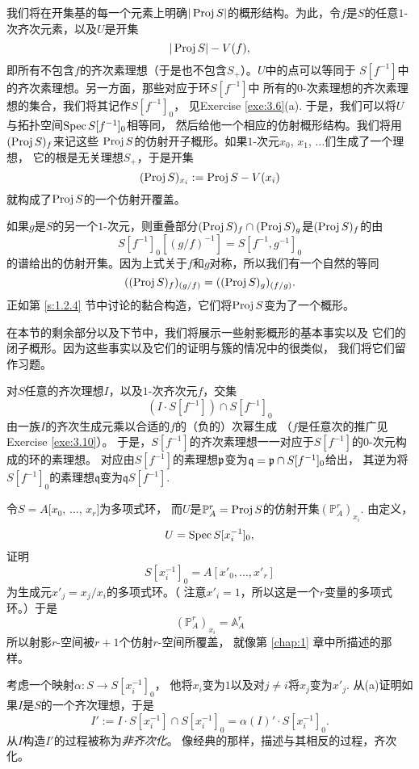 我们将在开集基的每一个元素上明确$|\operatorname{Proj} S|$的概形结构。为此，令$f$是$S$的任意$1$-次齐次元素，以及$U$是开集
\[
	|\operatorname{Proj} S|-V(f),
\]
即所有不包含$f$的齐次素理想（于是也不包含$S_+$）。$U$中的点可以等同于
$S[f^{-1}]$中的齐次素理想。另一方面，那些对应于环$S[f^{-1}]$中
所有的$0$-次素理想的齐次素理想的集合，我们将其记作$S[f^{-1}]_0$，
见Exercise \ref{exe:3.6}(a). 
于是，我们可以将$U$与拓扑空间$\operatorname{Spec} S[f^{-1}]_0$相等同，
然后给他一个相应的仿射概形结构。我们将用$(\operatorname{Proj} S)_f$来记这些
$\operatorname{Proj} S$的仿射开子概形。如果$1$-次元$x_0$, $x_1$, $\dots$们生成了一个理想，
它的根是无关理想$S_+$，于是开集
\[
	(\operatorname{Proj} S)_{x_i}:=\operatorname{Proj} S-V(x_i)
\]
就构成了$\operatorname{Proj} S$的一个仿射开覆盖。

如果$g$是$S$的另一个$1$-次元，则重叠部分$(\operatorname{Proj} S)_f\cap (\operatorname{Proj} S)_g$是$(\operatorname{Proj} S)_f$的由
\[
	S[f^{-1}]_0[(g/f)^{-1}]=S[f^{-1},g^{-1}]_0
\]
的谱给出的仿射开集。因为上式关于$f$和$g$对称，所以我们有一个自然的等同
\[
	((\operatorname{Proj} S)_f)_{(g/f)}=((\operatorname{Proj} S)_g)_{(f/g)}.
\]
正如第 \ref{s:1.2.4} 节中讨论的黏合构造，它们将$\operatorname{Proj} S$变为了一个概形。

在本节的剩余部分以及下节中，我们将展示一些射影概形的基本事实以及
它们的闭子概形。因为这些事实以及它们的证明与簇的情况中的很类似，
我们将它们留作习题。


\begin{exe}\label{exe:3.6}
\begin{compactenum}[(a)]
\item 对$S$任意的齐次理想$I$，以及$1$-次齐次元$f$，交集
\[
	(I\cdot S[f^{-1}])\cap S[f^{-1}]_0
\]
由一族$I$的齐次生成元乘以合适的$f$的（负的）次幂生成
（$f$是任意次的推广见 Exercise \ref{exe:3.10}）。
于是，$S[f^{-1}]$的齐次素理想一一对应于$S[f^{-1}]$的$0$-次元构成的环的素理想。
对应由$S[f^{-1}]$的素理想$\mathfrak{p}$变为$\mathfrak q=\mathfrak{p}\cap S[f^{-1}]_0$给出，
其逆为将$S[f^{-1}]_0$的素理想$\mathfrak{q}$变为$\mathfrak qS[f^{-1}]$.

\item 令$S=A[x_0$, $\dots$, $x_r]$为多项式环，
而$U$是$\mathbb P_A^r=\operatorname{Proj} S$的仿射开集$(\mathbb P_A^r)_{x_i}$. 由定义，
\[
	U=\operatorname{Spec} S[x_i^{-1}]_0,
\]
证明
\[
	S[x_i^{-1}]_0=A[x'_0,\dots,x'_r]
\]
为生成元$x'_j=x_j/x_i$的多项式环。（
注意$x'_i=1$，所以这是一个$r$变量的多项式环。）于是
\[
	(\mathbb P^r_A)_{x_i}=\mathbb A_A^r
\]
所以射影$r$-空间被$r+1$个仿射$r$-空间所覆盖，
就像第 \ref{chap:1} 章中所描述的那样。

\item 考虑一个映射$\alpha:S\to S[x_i^{-1}]_0$，
他将$x_i$变为$1$以及对$j\neq i$将$x_j$变为$x'_j$. 
从(a)证明如果$I$是$S$的一个齐次理想，于是
\[
	I':=I\cdot S[x_i^{-1}]\cap S[x_i^{-1}]_0=\alpha(I)'\cdot S[x_i^{-1}]_0.
\]
从$I$构造$I'$的过程被称为\textit{非齐次化}。
像经典的那样，描述与其相反的过程，齐次化。
\end{compactenum}
\end{exe}

